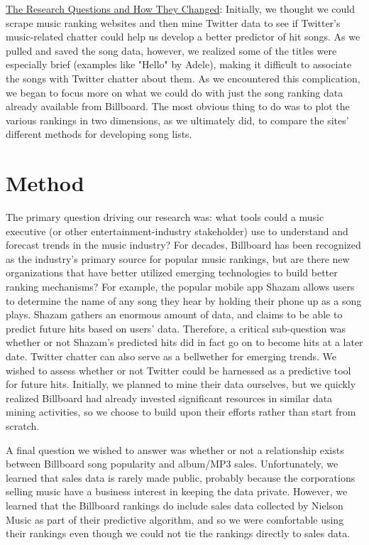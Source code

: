 \documentclass{article}
\begin{document}
\noindent
\underline{The Research Questions and How They Changed}:  Initially, we thought we could scrape music ranking websites and then mine Twitter data to see if Twitter's music-related chatter could help us develop a better predictor of hit songs.  As we pulled and saved the song data, however, we realized some of the titles were especially brief (examples like "Hello" by Adele), making it difficult to associate the songs with Twitter chatter about them.  As we encountered this complication, we began to focus more on what we could do with just the song ranking data already available from Billboard.  The most obvious thing to do was to plot the various rankings in two dimensions, as we ultimately did, to compare the sites' different methods for developing song lists.   



\section{Method}

The primary question driving our research was: what tools could a music executive (or other entertainment-industry stakeholder) use to understand and forecast trends in the music industry? For decades, Billboard has been recognized as the industry's primary source for popular music rankings, but are there new organizations that have better utilized emerging technologies to build better ranking mechanisms? For example, the popular mobile app Shazam allows users to determine the name of any song they hear by holding their phone up as a song plays. Shazam gathers an enormous amount of data, and claims to be able to predict future hits based on users' data. Therefore, a critical sub-question was whether or not Shazam's predicted hits did in fact go on to become hits at a later date. Twitter chatter can also serve as a bellwether for emerging trends. We wished to assess whether or not Twitter could be harnessed as a predictive tool for future hits. Initially, we planned to mine their data ourselves, but we quickly realized Billboard had already invested significant resources in similar data mining activities, so we choose to build upon their efforts rather than start from scratch. \vspace{2mm}

\noindent
A final question we wished to answer was whether or not a relationship exists between Billboard song popularity and album/MP3 sales. Unfortunately, we learned that sales data is rarely made public, probably because the corporations selling music have a business interest in keeping the data private. However, we learned that the Billboard rankings do include sales data collected by Nielson Music as part of their predictive algorithm, and so we were comfortable using their rankings even though we could not tie the rankings directly to sales data.
\end{document}
